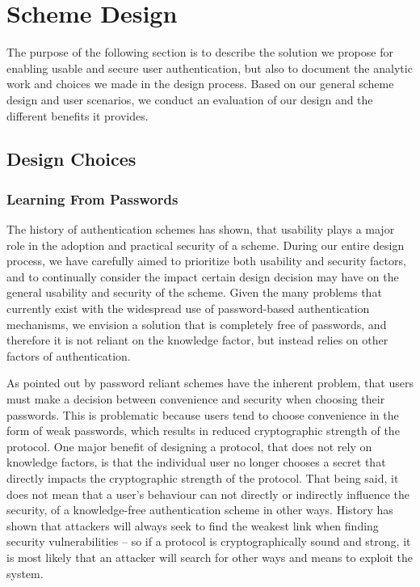 \chapter{Scheme Design}\label{ch:design}

The purpose of the following section is to describe the solution we propose for enabling usable and secure user authentication, but also to document the analytic work and choices we made in the design process. Based on our general scheme design and user scenarios, we conduct an evaluation of our design and the different benefits it provides.

\section{Design Choices}
\subsection{Learning From Passwords}
The history of authentication schemes has shown, that usability plays a major role in the adoption and practical security of a scheme. During our entire design process, we have carefully aimed to prioritize both usability and security factors, and to continually consider the impact certain design decision may have on the general usability and security of the scheme. 
Given the many problems that currently exist with the widespread use of password-based authentication mechanisms, we envision a solution that is completely free of passwords, and therefore it is not reliant on the knowledge factor, but instead relies on other factors of authentication.

As pointed out by \citet{weirich2001pretty} password reliant schemes have the inherent problem, that users must make a decision between convenience and security when choosing their passwords. This is problematic because users tend to choose convenience in the form of weak passwords, which results in reduced cryptographic strength of the protocol. 
One major benefit of designing a protocol, that does not rely on knowledge factors, is that the individual user no longer chooses a secret that directly impacts the cryptographic strength of the protocol. That being said, it does not mean that a user's behaviour can not directly or indirectly influence the security, of a knowledge-free authentication scheme in other ways. History has shown that attackers will always seek to find the weakest link when finding security vulnerabilities -- so if a protocol is cryptographically sound and strong, it is most likely that an attacker will search for other ways and means to exploit the system.

